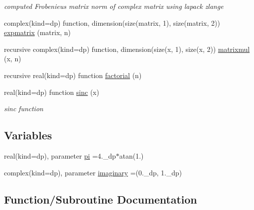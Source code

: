 \begin{DoxyCompactItemize}
\begin{DoxyCompactList}\small\item\em computed Frobenieus matrix norm of complex matrix using lapack zlange \end{DoxyCompactList}\item 
complex(kind=dp) function, dimension(size(matrix, 1), size(matrix, 2)) \hyperlink{namespaceolis__f90stdlib_a309c2107f5d5071bb8c1bad4362f88e1}{expmatrix} (matrix, n)
\item 
recursive complex(kind=dp) function, dimension(size(x, 1), size(x, 2)) \hyperlink{namespaceolis__f90stdlib_af70533a90b595522cd1bf47b37a2319d}{matrixmul} (x, n)
\item 
recursive real(kind=dp) function \hyperlink{namespaceolis__f90stdlib_ad0e4f304a609e1d8c088778344f1aa67}{factorial} (n)
\item 
real(kind=dp) function \hyperlink{namespaceolis__f90stdlib_a686d3815f56b261f358b016fe0ff8253}{sinc} (x)
\begin{DoxyCompactList}\small\item\em sinc function \end{DoxyCompactList}\end{DoxyCompactItemize}
\subsection*{Variables}
\begin{DoxyCompactItemize}
\item 
real(kind=dp), parameter \hyperlink{namespaceolis__f90stdlib_a106e09303fbf05972f0635ff67f73c9d}{pi} =4.\+\_\+dp$\ast$atan(1.)
\item 
complex(kind=dp), parameter \hyperlink{namespaceolis__f90stdlib_a0a22d30625256a14acc49cd749e88cb7}{imaginary} =(0.\+\_\+dp, 1.\+\_\+dp)
\end{DoxyCompactItemize}


\subsection{Function/\+Subroutine Documentation}
